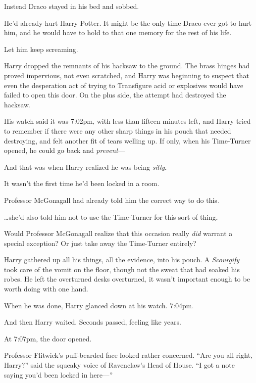 Instead Draco stayed in his bed and sobbed.

He’d already hurt Harry Potter. It might be the only time Draco ever got to
hurt him, and he would have to hold to that one memory for the rest of his life.

Let him keep screaming.

\later

Harry dropped the remnants of his hacksaw to the ground. The brass hinges had
proved impervious, not even scratched, and Harry was beginning to suspect that
even the desperation act of trying to Transfigure acid or explosives would have
failed to open this door. On the plus side, the attempt had destroyed the
hacksaw.

His watch said it was 7:02pm, with less than fifteen minutes left, and Harry
tried to remember if there were any other sharp things in his pouch that needed
destroying, and felt another fit of tears welling up. If only, when his
Time-Turner opened, he could go back and \emph{prevent}—

And that was when Harry realized he was being \emph{silly}.

It wasn’t the first time he’d been locked in a room.

Professor McGonagall had already told him the correct way to do this.

…she’d also told him not to use the Time-Turner for this sort of thing.

Would Professor McGonagall realize that this occasion really \emph{did} warrant
a special exception? Or just take away the Time-Turner entirely?

Harry gathered up all his things, all the evidence, into his pouch. A
\emph{Scourgify} took care of the vomit on the floor, though not the sweat that
had soaked his robes. He left the overturned desks overturned, it wasn’t
important enough to be worth doing with one hand.

When he was done, Harry glanced down at his watch. 7:04pm.

And then Harry waited. Seconds passed, feeling like years.

At 7:07pm, the door opened.

Professor Flitwick’s puff-bearded face looked rather concerned. “Are you all
right, Harry?” said the squeaky voice of Ravenclaw’s Head of House. “I got a
note saying you’d been locked in here—”
